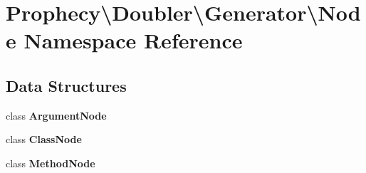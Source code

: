 \section{Prophecy\textbackslash{}Doubler\textbackslash{}Generator\textbackslash{}Node Namespace Reference}
\label{namespace_prophecy_1_1_doubler_1_1_generator_1_1_node}
\subsection*{Data Structures}
\begin{DoxyCompactItemize}
\item 
class {\bf Argument\+Node}
\item 
class {\bf Class\+Node}
\item 
class {\bf Method\+Node}
\end{DoxyCompactItemize}
